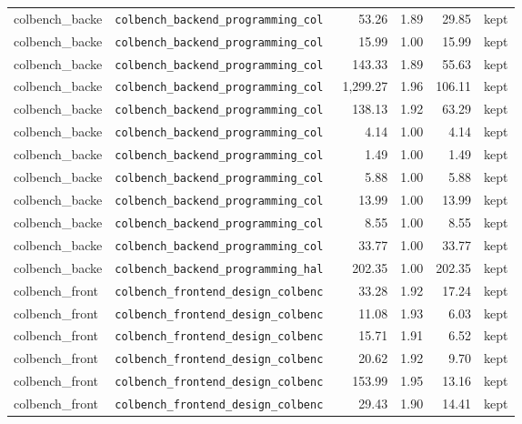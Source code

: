 {\begin{longtable}{llrrrl}
colbench\_backe & \texttt{\scriptsize colbench\_backend\_programming\_col~} & 53.26 & 1.89 & 29.85 & kept \\
colbench\_backe & \texttt{\scriptsize colbench\_backend\_programming\_col~} & 15.99 & 1.00 & 15.99 & kept \\
colbench\_backe & \texttt{\scriptsize colbench\_backend\_programming\_col~} & 143.33 & 1.89 & 55.63 & kept \\
colbench\_backe & \texttt{\scriptsize colbench\_backend\_programming\_col~} & 1,299.27 & 1.96 & 106.11 & kept \\
colbench\_backe & \texttt{\scriptsize colbench\_backend\_programming\_col~} & 138.13 & 1.92 & 63.29 & kept \\
colbench\_backe & \texttt{\scriptsize colbench\_backend\_programming\_col~} & 4.14 & 1.00 & 4.14 & kept \\
colbench\_backe & \texttt{\scriptsize colbench\_backend\_programming\_col~} & 1.49 & 1.00 & 1.49 & kept \\
colbench\_backe & \texttt{\scriptsize colbench\_backend\_programming\_col~} & 5.88 & 1.00 & 5.88 & kept \\
colbench\_backe & \texttt{\scriptsize colbench\_backend\_programming\_col~} & 13.99 & 1.00 & 13.99 & kept \\
colbench\_backe & \texttt{\scriptsize colbench\_backend\_programming\_col~} & 8.55 & 1.00 & 8.55 & kept \\
colbench\_backe & \texttt{\scriptsize colbench\_backend\_programming\_col~} & 33.77 & 1.00 & 33.77 & kept \\
colbench\_backe & \texttt{\scriptsize colbench\_backend\_programming\_hal~} & 202.35 & 1.00 & 202.35 & kept \\
colbench\_front & \texttt{\scriptsize colbench\_frontend\_design\_colbenc~} & 33.28 & 1.92 & 17.24 & kept \\
colbench\_front & \texttt{\scriptsize colbench\_frontend\_design\_colbenc~} & 11.08 & 1.93 & 6.03 & kept \\
colbench\_front & \texttt{\scriptsize colbench\_frontend\_design\_colbenc~} & 15.71 & 1.91 & 6.52 & kept \\
colbench\_front & \texttt{\scriptsize colbench\_frontend\_design\_colbenc~} & 20.62 & 1.92 & 9.70 & kept \\
colbench\_front & \texttt{\scriptsize colbench\_frontend\_design\_colbenc~} & 153.99 & 1.95 & 13.16 & kept \\
colbench\_front & \texttt{\scriptsize colbench\_frontend\_design\_colbenc~} & 29.43 & 1.90 & 14.41 & kept \\

\end{longtable}}
